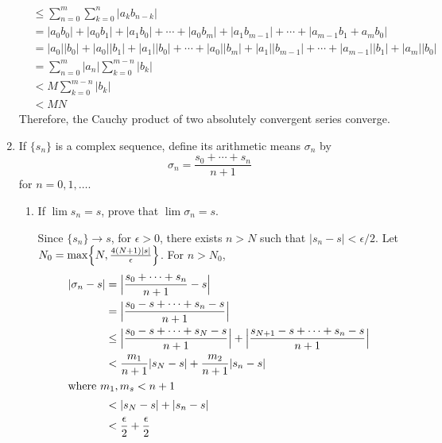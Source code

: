\begin{enumerate}
\begin{align*}
    & \leq \sum_{n = 0}^m\sum_{k = 0}^n\lvert a_kb_{n - k}\rvert\\
    & = \lvert a_0b_0\rvert + \lvert a_0b_1\rvert + \lvert a_1b_0\rvert +
      \cdots + \lvert a_0b_m\rvert + \lvert a_1b_{m - 1}\rvert + \cdots +
      \lvert a_{m - 1}b_1 + a_mb_0\rvert\\
    & = \lvert a_0\rvert\lvert b_0\rvert + \lvert a_0\rvert\lvert b_1\rvert +
      \lvert a_1\rvert\lvert b_0\rvert + \cdots + \lvert a_0\rvert
      \lvert b_m\rvert + \lvert a_1\rvert\lvert b_{m - 1}\rvert + \cdots +
      \lvert a_{m - 1}\rvert\lvert b_1\rvert + \lvert a_m\rvert
      \lvert b_0\rvert\\
    & = \sum_{n = 0}^m\lvert a_n\rvert\sum_{k = 0}^{m - n}\lvert b_k\rvert\\
    & < M\sum_{k = 0}^{m - n}\lvert b_k\rvert\\
    & < MN
  \end{align*}
  Therefore, the Cauchy product of two absolutely convergent series converge.
\item
  If \(\{s_n\}\) is a complex sequence, define its arithmetic means
  \(\sigma_n\) by
  \[
  \sigma_n = \frac{s_0 + \cdots + s_n}{n + 1}
  \]
  for \(n = 0,1,\ldots\).
  \begin{enumerate}[label = (\alph*), ref = \theenumi{} (\alph*)]
  \item
    \label{3.12.a}
    If \(\lim s_n = s\), prove that \(\lim\sigma_n = s\).
    \par\smallskip
    Since \(\{s_n\}\to s\), for \(\epsilon > 0\), there exists \(n > N\) such
    that \(\lvert s_n - s\rvert < \epsilon/2\).
    Let \(N_0 = \max\Bigl\{N,\frac{4(N + 1)\lvert s\rvert}{\epsilon}\Bigr\}\).
    For \(n > N_0\),
    \begin{align*}
      \lvert\sigma_n - s\rvert
      & = \Bigl\lvert\frac{s_0 + \cdots + s_n}{n + 1} - s\Bigr\rvert\\
      & = \Bigl\lvert\frac{s_0 - s + \cdots + s_n - s}{n + 1}\Bigr\rvert\\
      & \leq \Bigl\lvert\frac{s_0 - s + \cdots + s_N - s}{n + 1}\Bigr\rvert +
        \Bigl\lvert\frac{s_{N + 1} - s + \cdots + s_n - s}{n + 1}\Bigr\rvert\\
      & < \frac{m_1}{n + 1}\lvert s_N - s\rvert + \frac{m_2}{n + 1}
        \lvert s_n - s\rvert\\
      \intertext{where \(m_1,m_s < n + 1\)}
      & < \lvert s_N - s\rvert + \lvert s_n - s\rvert\\
      & < \frac{\epsilon}{2} + \frac{\epsilon}{2}\\

\end{align*}
\end{enumerate}
\end{enumerate}
